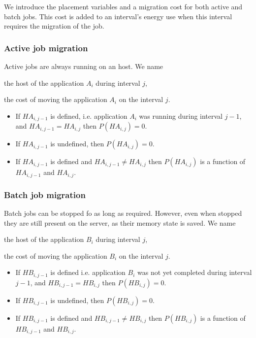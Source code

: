 \documentclass[a4paper]{article}
\begin{document}
We introduce the placement variables and a migration cost for both active and batch jobs. This cost is added to an interval's energy use when this interval requires the migration of the job.


\subsubsection{Active job migration}

Active jobs are always running on an host. We name

\begin{description}[labelwidth=4em,align=left,labelindent=2em]
	\item[$HA_{i,j}$] the host of the application $A_i$ during interval $j$,
	\item[$PHA_{i,j}$] the cost of moving the application $A_i$ on the interval $j$.
 		\begin{itemize}
			\item If $HA_{i,j-1}$ is defined, i.e. application $A_i$ was running during interval $j-1$, and $HA_{i,j-1} = HA_{i,j}$ then $P(HA_{i,j}) = 0$.
			\item If $HA_{i,j-1}$ is undefined, then $P(HA_{i,j}) = 0$.
			\item If $HA_{i,j-1}$ is defined and $HA_{i,j-1} \neq HA_{i,j}$ then $P(HA_{i,j})$ is a function of $HA_{i,j-1}$ and $HA_{i,j}$.
		\end{itemize}
\end{description}

\subsubsection{Batch job migration}

Batch jobs can be stopped fo as long as required. However, even when stopped they are still present on the server, as their memory state is saved. We name

\begin{description}[labelwidth=4em,align=left,labelindent=2em]
	\item [$HB_{i,j}$] the host of the application $B_i$ during interval $j$,
	\item [$PHB_{i,j}$] the cost of moving the application $B_i$ on the interval $j$.
		\begin{itemize}
			\item If $HB_{i,j-1}$ is defined i.e. application $B_i$ was not yet completed during interval $j-1$, and $HB_{i,j-1} = HB_{i,j}$ then $P(HB_{i,j}) = 0$.
			\item If $HB_{i,j-1}$ is undefined, then $P(HB_{i,j}) = 0$.
			\item If $HB_{i,j-1}$ is defined and $HB_{i,j-1} \neq HB_{i,j}$ then $P(HB_{i,j})$ is a function of $HB_{i,j-1}$ and $HB_{i,j}$.
		\end{itemize}
\end{description}
\end{document}
